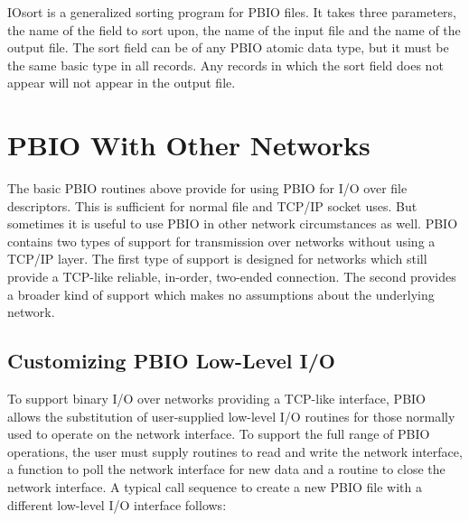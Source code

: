 \documentclass{article}
\begin{document}
IOsort is a generalized sorting program for PBIO files.  It takes three
parameters, the name of the field to sort upon, the name of the input file and
the name of the output file.  The sort field can be of any PBIO atomic data
type, but it must be the same basic type in all records.  Any records in which
the sort field does not appear will not appear in the output file.

\section{PBIO With Other Networks}

The basic PBIO routines above provide for using PBIO for I/O over file
descriptors.  This is sufficient for normal file and TCP/IP socket uses.  But
sometimes it is useful to use PBIO in other network circumstances as well.
PBIO contains two types of support for transmission over networks without
using a TCP/IP layer.  The first type of support is designed for networks
which still provide a TCP-like reliable, in-order, two-ended connection.  The
second provides a broader kind of support which makes no assumptions about the
underlying network.

\subsection{Customizing PBIO Low-Level I/O}

To support binary I/O over networks providing a TCP-like interface, PBIO
allows the substitution of user-supplied low-level I/O routines for those
normally used to operate on the network interface.  To support the full range
of PBIO operations, the user must supply routines to read and write the
network interface, a function to poll the network interface for new data and a
routine to close the network interface.  A typical call sequence to create a
new PBIO file with a different low-level I/O interface follows:
\end{document}
